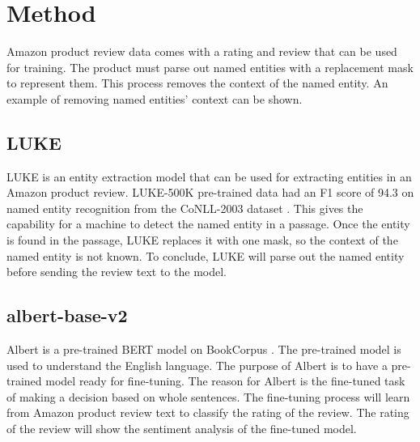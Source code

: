\documentclass[11pt,a4paper]{article}
\begin{document}
\section{Method}

Amazon product review data comes with a rating and review that can be used for training. The product must parse out named entities with a replacement mask to represent them. This process removes the context of the named entity. An example of removing named entities' context can be shown.


\subsection{LUKE}

LUKE is an entity extraction model that can be used for extracting entities in an Amazon product review. LUKE-500K pre-trained data had an F1 score of 94.3 on named entity recognition from the CoNLL-2003 dataset \cite{yamada-etal-2020-luke}. This gives the capability for a machine to detect the named entity in a passage. Once the entity is found in the passage, LUKE replaces it with one mask, so the context of the named entity is not known. To conclude, LUKE will parse out the named entity before sending the review text to the model.

\subsection{albert-base-v2}

Albert is a pre-trained BERT model on BookCorpus \cite{DBLP:journals/corr/abs-1909-11942}. The pre-trained model is used to understand the English language. The purpose of Albert is to have a pre-trained model ready for fine-tuning. The reason for Albert is the fine-tuned task of making a decision based on whole sentences. The fine-tuning process will learn from Amazon product review text to classify the rating of the review. The rating of the review will show the sentiment analysis of the fine-tuned model.
\end{document}
